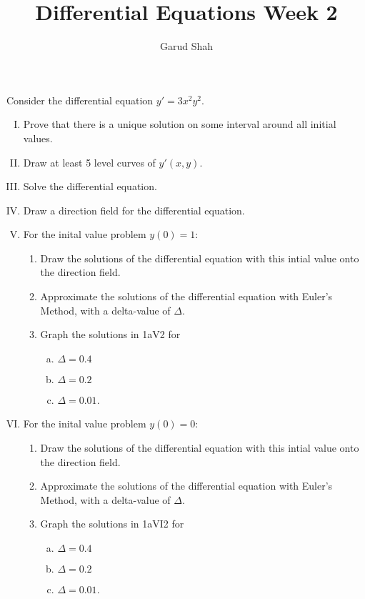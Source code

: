 \documentclass{article}
\title{Differential Equations Week 2}
\author{Garud Shah}
\begin{document}
\maketitle
\begin{problem}[Problem 1a]
    Consider the differential equation $y' = 3x^2y^2$.
        \begin{enumerate}[I.]
            \item Prove that there is a unique solution on some interval around all initial values.
            \item Draw at least 5 level curves of $y'(x,y)$.
            \item Solve the differential equation.
            \item Draw a direction field for the differential equation.
            \item For the inital value problem $y(0)=1$:
            \begin{enumerate}[1.]
                \item Draw the solutions of the differential equation with this 
                intial value onto the direction field.
                \item Approximate the solutions of the differential equation with Euler's Method,
                with a delta-value of $\Delta$. 
                \item Graph the solutions in 1aV2 for
                \begin{enumerate}[(a)]
                    \item $\Delta = 0.4$
                    \item $\Delta = 0.2$
                    \item $\Delta = 0.01$.
                \end{enumerate}
            \end{enumerate}
            \item For the inital value problem $y(0)=0$:
            \begin{enumerate}[1.]
                \item Draw the solutions of the differential equation with this 
                intial value onto the direction field.
                \item Approximate the solutions of the differential equation with Euler's Method,
                with a delta-value of $\Delta$. 
                \item Graph the solutions in 1aVI2 for
                \begin{enumerate}[(a)]
                    \item $\Delta = 0.4$
                    \item $\Delta = 0.2$
                    \item $\Delta = 0.01$.
                \end{enumerate}
            \end{enumerate}
        \end{enumerate}
    \end{problem} 
\end{document}
